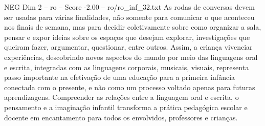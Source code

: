 \begin{textsample}{NEG Dim 2 – ro – Score -2.00 – ro/ro\_inf\_32.txt}
As rodas de conversas devem ser usadas para várias finalidades, não somente para comunicar o que aconteceu nos finais de semana, mas para decidir coletivamente sobre como organizar a sala, pensar e expor ideias sobre os espaços que desejam explorar, investigações que queiram fazer, argumentar, questionar, entre outros.
Assim, a criança vivenciar experiências, descobrindo novos aspectos do mundo por meio das linguagens oral e escrita, integradas com as linguagens corporais, musicais, visuais, representa passo importante na efetivação de uma educação para a primeira infância conectada com o presente, e não como um processo voltado apenas para futuras aprendizagens.
Compreender as relações entre a linguagem oral e escrita, o pensamento e a imaginação infantil transforma a prática pedagógica escolar e docente em encantamento para todos os envolvidos, professores e crianças.

\end{textsample}
